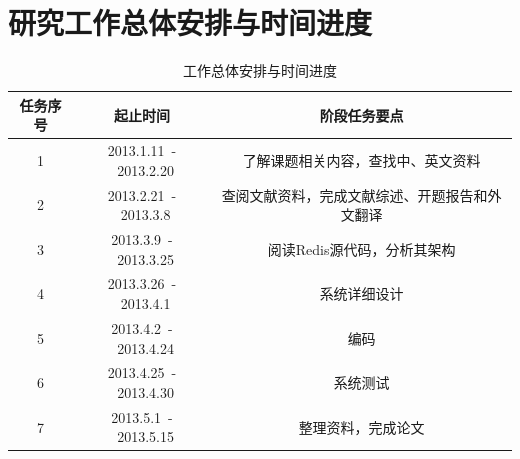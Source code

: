 \documentclass[proposal]{zjutreport}
\begin{document}
\chapter{研究工作总体安排与时间进度}
\begin{table}[htbp]
\caption{工作总体安排与时间进度}\label{tab:table1}
\vspace{0.5em}
\begin{center}
{\wuhao
\begin{tabular}{|c|c|c|}
\hline
任务序号 & 起止时间 & 阶段任务要点\\ \hline
1 & 2013.1.11~-~2013.2.20 & 了解课题相关内容，查找中、英文资料\\ \hline
2 & 2013.2.21~-~2013.3.8 & 查阅文献资料，完成文献综述、开题报告和外文翻译\\ \hline
3 & 2013.3.9~-~2013.3.25 & 阅读Redis源代码，分析其架构\\ \hline
4 & 2013.3.26~-~2013.4.1 & 系统详细设计\\ \hline
5 & 2013.4.2~-~2013.4.24 & 编码\\ \hline
6 & 2013.4.25~-~2013.4.30 & 系统测试\\ \hline
7 & 2013.5.1~-~2013.5.15 & 整理资料，完成论文\\ \hline
\end{tabular}}
\end{center}
\vspace{\baselineskip}
\end{table}


\clearpage %


\backmatter
\endgroup %
\nocite{*}                                   %

\end{document}
